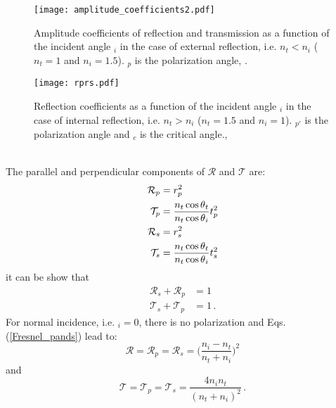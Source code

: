 \begin{figure}[h]
  \begin{minipage}[h]{0.4\textwidth}
    \texttt{[image: amplitude\_coefficients2.pdf]}
    \caption{Amplitude coefficients of reflection and transmission as a function of the incident angle \myangle$_i$ in the case of external reflection, i.e. $n_t<n_i$
($n_t = 1$ and $n_i=1.5$). \myangle$_p$ is the polarization angle, \cite{hecht1998hecht}.}
    \label{fig:coefficients}
  \end{minipage} \hspace{2.5cm}
  \begin{minipage}[h]{0.4\textwidth}
    \texttt{[image: rprs.pdf]}
    \caption{Reflection coefficients as a function of the incident angle \myangle$_i$ in the case of internal reflection, i.e. $n_t>n_i$
($n_t = 1.5$ and $n_i=1$). \myangle$_{p\prime}$ is the polarization angle and \myangle$_c$ is the critical angle., \cite{hecht1998hecht}}
   \label{fig:coefficients2}
 \end{minipage}
\end{figure}
\\ The parallel and perpendicular components of $\mathcal{R}$ and $\mathcal{T}$ are:
\begin{equation}\label{Fresnel_pands}
\begin{split}
\mathcal{R}_p& =  {r_p^2}\\
\mathcal{T}_p &=  \frac{n_t \cos\mbox{$\theta$}_t}{n_t \cos\mbox{$\theta$}_i}t_p^2\\
\mathcal{R}_s &=  r_s^2\\
\mathcal{T}_s &= \frac{n_t \cos\mbox{$\theta$}_t}{n_t \cos\mbox{$\theta$}_i}t_s^2\\
\end{split}
\end{equation}
it can be show that
\begin{equation}
\begin{split}
\mathcal{R}_s+\mathcal{R}_p &= 1\\
\mathcal{T}_s+\mathcal{T}_p &=1\,.
\end{split}
\end{equation}
For normal incidence, i.e. \myangle$_i = 0$, there is no polarization and Eqs. (\ref{Fresnel_pands}) lead to:
\begin{equation}
\mathcal{R} = \mathcal{R}_p = \mathcal{R}_s = \Bigg(\frac{n_i-n_t}{n_t+n_i}\Bigg)^2
\end{equation}
and 
\begin{equation}
\mathcal{T} = \mathcal{T}_p = \mathcal{T}_s = \frac{4n_i n_t}{(n_t+n_i)^2}\,.
\end{equation}
